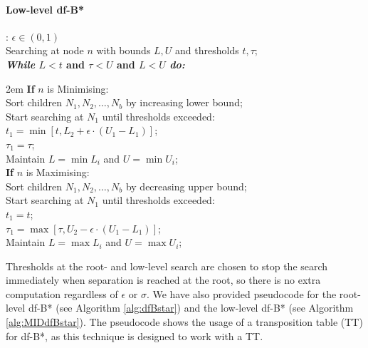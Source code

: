 {{\begin{minipage}[c]{0.8\linewidth}
    \paragraph{Low-level df-B*}: $\epsilon\in\left(0,1\right)$\\
    Searching at node $n$ with bounds $L, U$ and thresholds $t, \tau$;\\
    \textbf{\textit{While} $L < t$ and $\tau < U$ and $L < U$ \textit{do:}}
    \begin{addmargin}[1em]{2em}
        \textbf{If} $n$ is Minimising:\\
        \phantom{}\hspace{1em} Sort children $N_1,N_2,\dots,N_b$ by increasing lower bound;\\
        \phantom{}\hspace{1em} Start searching at $N_1$ until thresholds exceeded:\\
        \phantom{}\hspace{2em} $t_1=\min\left[t, L_2+\epsilon\cdot\left(U_1-L_1\right)\right]$;\\
        \phantom{}\hspace{2em} $\tau_1=\tau$;\\
        \phantom{}\hspace{1em} Maintain $L=\min L_i$ and $U=\min U_i$;\\
        \textbf{If} $n$ is Maximising:\\
        \phantom{}\hspace{1em} Sort children $N_1,N_2,\dots,N_b$ by decreasing upper bound;\\
        \phantom{}\hspace{1em} Start searching at $N_1$ until thresholds exceeded:\\
        \phantom{}\hspace{2em} $t_1=t$;\\
        \phantom{}\hspace{2em} $\tau_1=\max\left[\tau, U_2-\epsilon\cdot\left(U_1-L_1\right)\right]$;\\
        \phantom{}\hspace{1em} Maintain $L=\max L_i$ and $U=\max U_i$;\\
    \end{addmargin}
\end{minipage}
}}\vspace{2ex}
Thresholds at the root- and low-level search are chosen to stop the search immediately when separation is reached at the root, so there is no extra computation regardless of $\epsilon$ or $\sigma$. We have also provided pseudocode for the root-level df-B* (see Algorithm \ref{alg:dfBstar}) and the low-level df-B* (see Algorithm \ref{alg:MIDdfBstar}). The pseudocode shows the usage of a transposition table (TT) for df-B*, as this technique is designed to work with a TT.
